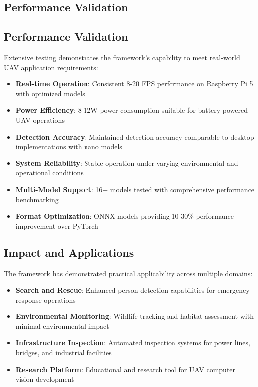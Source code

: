 \documentclass[11pt,a4paper]{article}
\begin{document}
\subsection{Performance Validation}

\subsection{Performance Validation}

Extensive testing demonstrates the framework's capability to meet real-world UAV application requirements:

\begin{itemize}
    \item \textbf{Real-time Operation}: Consistent 8-20 FPS performance on Raspberry Pi 5 with optimized models
    \item \textbf{Power Efficiency}: 8-12W power consumption suitable for battery-powered UAV operations
    \item \textbf{Detection Accuracy}: Maintained detection accuracy comparable to desktop implementations with nano models
    \item \textbf{System Reliability}: Stable operation under varying environmental and operational conditions
    \item \textbf{Multi-Model Support}: 16+ models tested with comprehensive performance benchmarking
    \item \textbf{Format Optimization}: ONNX models providing 10-30\% performance improvement over PyTorch
\end{itemize}

\subsection{Impact and Applications}

The framework has demonstrated practical applicability across multiple domains:

\begin{itemize}
    \item \textbf{Search and Rescue}: Enhanced person detection capabilities for emergency response operations
    \item \textbf{Environmental Monitoring}: Wildlife tracking and habitat assessment with minimal environmental impact
    \item \textbf{Infrastructure Inspection}: Automated inspection systems for power lines, bridges, and industrial facilities
    \item \textbf{Research Platform}: Educational and research tool for UAV computer vision development
\end{itemize}
\end{document}
